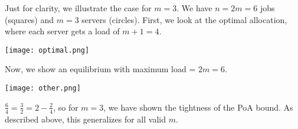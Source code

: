 \documentclass[12 pt]{article}
\begin{document}
	\noindent Just for clarity, we illustrate the case for $m = 3$. We have $n = 2m = 6$ jobs (squares) and $m = 3$ servers (circles). First, we look at the optimal allocation, where each server gets a load of $m + 1 = 4$. \\
	\begin{center}
	\texttt{[image: optimal.png]}
	\end{center}

	\noindent Now, we show an equilibrium with maximum load = $2m = 6$. 
	
	\begin{center}
		\texttt{[image: other.png]}
	\end{center}

	\noindent $\frac{6}{4} = \frac{3}{2} = 2 - \frac{2}{4}$, so for $m = 3$, we have shown the tightness of the PoA bound. As described above, this generalizes for all valid $m$. 
\end{document}
